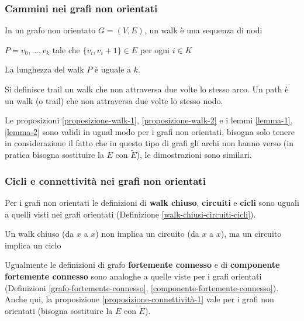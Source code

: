 \subsubsection{Cammini nei grafi non orientati}
\begin{definition}[Walk]
    In un grafo non orientato $G = (V,E)$, un walk è una sequenza di nodi
    \begin{center}
        $P = v_0, \ldots, v_k$ tale che $\{v_i, v_i+1\} \in E$ per ogni $i \in K$
    \end{center}
    La lunghezza del walk $P$ è uguale a $k$.
\end{definition}

\begin{definition}
    Si definisce trail un walk che non attraversa due volte lo stesso arco. Un path è un walk (o trail) che non attraversa due volte lo stesso nodo.
\end{definition}

Le proposizioni \ref{proposizione-walk-1}, \ref{proposizione-walk-2} e i lemmi \ref{lemma-1}, \ref{lemma-2}  sono validi in ugual modo per i grafi non orientati, bisogna solo tenere in considerazione il fatto che in questo tipo di grafi gli archi non hanno verso (in pratica bisogna sostituire la $E$ con $\widetilde{E}$), le dimostrazioni sono similari.

\subsubsection{Cicli e connettività nei grafi non orientati}
Per i grafi non orientati le definizioni di \textbf{walk chiuso}, \textbf{circuiti} e \textbf{cicli} sono uguali a quelli visti nei grafi orientati (Definizione \ref{walk-chiusi-circuiti-cicli}).
\begin{note}
Un walk chiuso (da $x$ a $x$) non implica un circuito (da $x$ a $x$), ma un circuito implica un ciclo
\end{note}
Ugualmente le definizioni di grafo \textbf{fortemente connesso} e  di \textbf{componente fortemente connesso} sono analoghe a quelle viste per i grafi orientati (Definizioni \ref{grafo-fortemente-connesso}, \ref{componente-fortemente-connesso}).\\
Anche qui, la proposizione \ref{proposizione-connettività-1} vale  per i grafi non orientati (bisogna sostituire la $E$ con $\widetilde{E}$).



